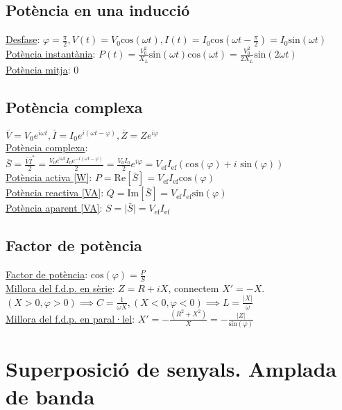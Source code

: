 \documentclass[12pt]{article}
\begin{document}
\begin{multicols}{5}
\subsection{Potència en una inducció}

\underline{Desfase}: $\varphi = \frac{\pi}{2}, V(t) = V_0\text{cos}(\omega t), I(t) = I_0\text{cos}(\omega t - \frac{\pi}{2}) = I_0\text{sin}(\omega t)$ \\
\underline{Potència instantània}: $P(t) = \frac{V_0^2}{X_L}\text{sin}(\omega t)\text{cos}(\omega t) = \frac{V_0^2}{2X_L}\text{sin}(2\omega t)$ \\
\underline{Potència mitja}: 0

\subsection{Potència complexa}

$\bar{V} = V_0e^{i\omega t}, \bar{I} = I_0e^{i(\omega t - \varphi)}, \bar{Z} = Z e^{i\varphi}$ \\
\underline{Potència complexa}: $\bar{S} = \frac{\bar{V}\bar{I}^*}{2} = \frac{V_0e^{i\omega t}I_0e^{-i(\omega t - \varphi)}}{2} = \frac{V_0I_0}{2}e^{i\varphi} = V_{\text{ef}}I_{\text{ef}}(\text{cos}(\varphi) + i\text{ sin}(\varphi))$ \\
\underline{Potència activa [W]}: $P = \text{Re}[\bar{S}] = V_{\text{ef}}I_{\text{ef}}\text{cos}(\varphi)$ \\
\underline{Potència reactiva [VA]}: $Q = \text{Im}[\bar{S}] = V_{\text{ef}}I_{\text{ef}}\text{sin}(\varphi)$ \\
\underline{Potència aparent [VA]}: $S = \vert \bar{S} \vert = V_{\text{ef}}I_{\text{ef}}$

\subsection{Factor de potència}

\underline{Factor de potència}: $\text{cos}(\varphi) = \frac{P}{S}$ \\
\underline{Millora del f.d.p. en sèrie}: $Z = R + iX$, connectem $X' = -X$. $(X>0,\varphi>0) \implies C=\frac{1}{\omega X}, (X<0, \varphi<0) \implies L=\frac{\vert X\vert}{\omega}$ \\
\underline{Millora del f.d.p. en paral·lel}: $X' = -\frac{(R^2+X^2)}{X} = -\frac{\vert Z\vert}{\text{sin}(\varphi)}$

\section{Superposició de senyals. Amplada de banda}


\end{multicols}
\end{document}
